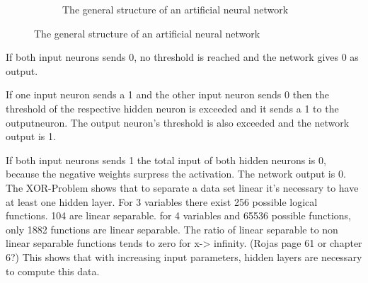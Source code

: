 \documentclass[10pt,a4paper,DIV=11]{scrreprt}
\begin{document}
\begin{figure}[H]
\begin{subfigure}[]{0.5\linewidth}
\begin{center}
					\caption{The general structure of an artificial neural network}
					\label{fig:xor-solution}
				\end{center}
			\end{subfigure}
\end{figure}

If both input neurons sends 0, no threshold is reached and the network gives 0 as output.

If one input neuron sends a 1 and the other input neuron sends 0 then the threshold of the respective hidden neuron is exceeded and it sends a 1 to the outputneuron. The  output neuron's threshold is also exceeded and the network output is 1.

If both input neurons sends 1 the total input of both hidden neurons is 0, because the negative weights surpress the activation. The network output is 0.\\




The XOR-Problem shows that to separate a data set linear it's necessary to have at least one hidden layer.
For 3 variables there exist 256 possible logical functions. 104 are linear separable.
for 4 variables and 65536 possible functions, only 1882 functions are linear separable.
The ratio of linear separable to non linear separable functions tends to zero for x-> infinity. (Rojas page 61 or chapter 6?)
This shows that with increasing input parameters, hidden layers are necessary to compute this data.
\end{document}
